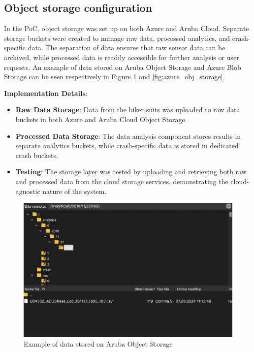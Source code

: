 \subsection{Object storage configuration}
In the PoC, object storage was set up on both Azure and Aruba Cloud. Separate storage buckets were created to manage raw data, processed analytics, and crash-specific data. The separation of data ensures that raw sensor data can be archived, while processed data is readily accessible for further analysis or user requests. An example of data stored on Aruba Object Storage and Azure Blob Storage can be seen respectively in Figure \ref{fig:aruba_obj_storage} and \ref{fig:azure_obj_storage}.

\textbf{Implementation Details}:
\begin{itemize}
    \item \textbf{Raw Data Storage}: Data from the biker suits was uploaded to raw data buckets in both Azure and Aruba Cloud Object Storage.
    \item \textbf{Processed Data Storage}: The data analysis component stores results in separate analytics buckets, while crash-specific data is stored in dedicated crash buckets.
    \item \textbf{Testing}: The storage layer was tested by uploading and retrieving both raw and processed data from the cloud storage services, demonstrating the cloud-agnostic nature of the system.
\end{itemize}

\begin{figure}[htbp]
    \centering
    \includegraphics[width=1\textwidth]{Immagini/data_storage.png}
    \caption{Example of data stored on Aruba Object Storage}
    \label{fig:aruba_obj_storage}
\end{figure}

